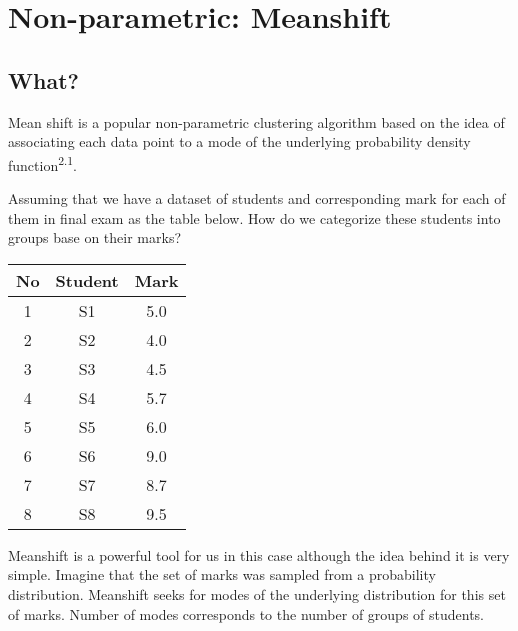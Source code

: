 \section{Non-parametric: Meanshift}

\subsection{What?}

Mean shift  is a popular non-parametric clustering algorithm based on the
idea of associating each data point to a mode of the underlying probability density
function\textsuperscript{2.1}.{\linebreak}

Assuming that we have a dataset of students and corresponding mark for each of them 
in final exam as the table below. How do we categorize these students into groups base on their marks?
\begin{center}
 \begin{tabular}{||c c c||} 
 \hline
 No & Student & Mark \\ [0.5ex] 
 \hline\hline
 1 & S1 & 5.0 \\ 
 \hline
 2 & S2 & 4.0 \\
 \hline
 3 & S3 & 4.5 \\
 \hline
 4 & S4 & 5.7 \\
 \hline
 5 & S5 & 6.0 \\ 
  \hline
 6 & S6 & 9.0 \\ 
  \hline
 7 & S7 & 8.7 \\ 
  \hline
 8 & S8 & 9.5 \\ 
 [1ex] 
 \hline
\end{tabular}
\end{center}

Meanshift is a powerful tool for us in this case although the idea behind it is very simple.
Imagine that the set of marks was sampled from a probability distribution. Meanshift seeks for modes of  the underlying distribution for this set of marks. Number of modes corresponds to the number of groups of students.

